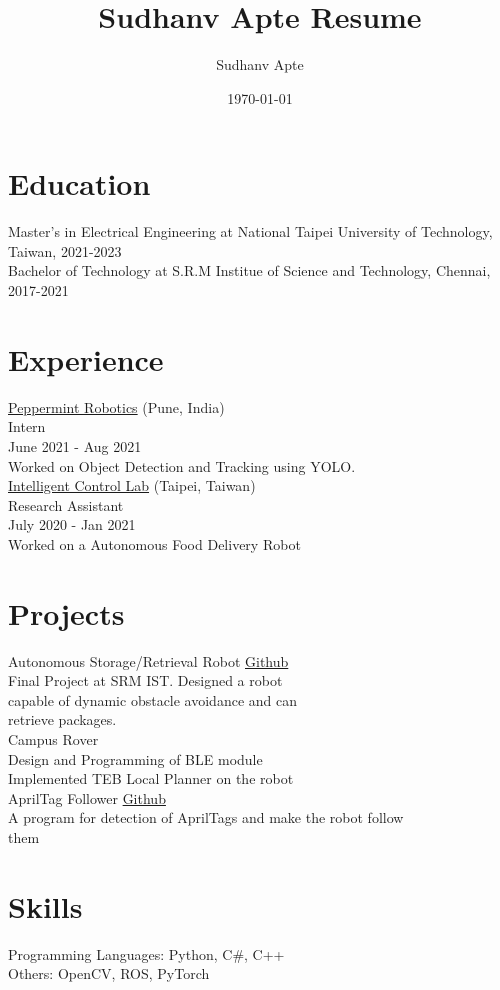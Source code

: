 \documentclass[11pt]{article}
\author{Sudhanv Apte}
\date{\today}
\title{Sudhanv Apte Resume}
\begin{document}
\maketitle


\section*{Education}
\label{sec:orgb981eff}
Master's in Electrical Engineering at National Taipei University of Technology, Taiwan, 2021-2023\\

Bachelor of Technology at S.R.M Institue of Science and Technology, Chennai, 2017-2021\\

\section*{Experience}
\label{sec:org569be7b}

\href{https://getpeppermint.co}{Peppermint Robotics} (Pune, India)\\
Intern\\
June 2021 - Aug 2021\\
Worked on Object Detection and Tracking using YOLO.\\

\href{https://itlab.ee.ntut.edu.tw/}{Intelligent Control Lab} (Taipei, Taiwan)\\
Research Assistant\\
July 2020 - Jan 2021\\
Worked on a Autonomous Food Delivery Robot\\

\section*{Projects}
\label{sec:org36d4f7c}
Autonomous Storage/Retrieval Robot \href{https://github.com/sudhanv09/Warehouse-Bot}{Github}\\
    Final Project at SRM IST. Designed a robot\\
    capable of dynamic obstacle avoidance and can\\
    retrieve packages.\\

Campus Rover\\
    Design and Programming of BLE module\\
    Implemented TEB Local Planner on the robot\\

AprilTag Follower \href{https://github.com/sudhanv09/AprilTag-Follower}{Github}\\
  A program for detection of AprilTags and make the robot follow\\
  them\\

\section*{Skills}
\label{sec:orgd4d5708}
Programming Languages: Python, C\#, C++\\
Others: OpenCV, ROS, PyTorch\\
\end{document}
